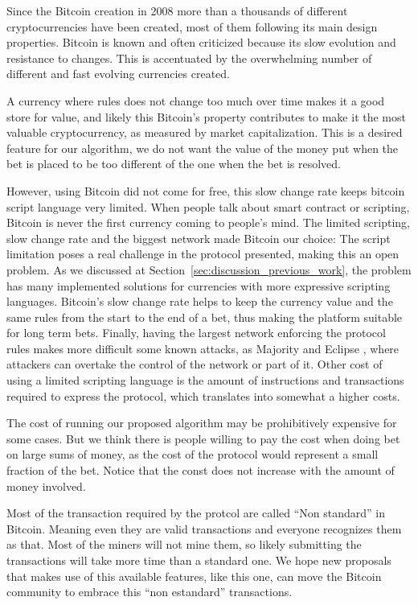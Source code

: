 Since the Bitcoin creation in 2008 more than a thousands of different
  cryptocurrencies have been created, most of them following its main design
  properties.
Bitcoin is known and often criticized because its slow evolution and resistance
  to changes.
This is accentuated by the overwhelming number of different and fast evolving
  currencies created.

A currency where rules does not change too much over time makes it a good store
  for value, and likely this Bitcoin's property contributes to make it the
  most valuable cryptocurrency, as measured by market capitalization.
This is a desired feature for our algorithm, we do not want the value of the
  money put when the bet is placed to be too different of the one when the bet
  is resolved.

However, using Bitcoin did not come for free, this slow change rate keeps
  bitcoin script language very limited.
When people talk about smart contract or scripting, Bitcoin is never the first
  currency coming to people's mind.
The limited scripting, slow change rate and the biggest network made Bitcoin our
  choice:
The script limitation poses a real challenge in the protocol presented, making this
  an open problem.
As we discussed at Section~\ref{sec:discussion_previous_work}, the problem has
  many implemented solutions for currencies with more expressive scripting
  languages.
Bitcoin's slow change rate helps to keep the currency value and the same rules
  from the start to the end of a bet, thus making the platform suitable for long
  term bets.
Finally, having the largest network enforcing the protocol rules makes more
  difficult some known attacks, as Majority and Eclipse
  \cite{heilman2015eclipse}, where attackers can overtake the control of the
  network or part of it.
Other cost of using a limited scripting language is the amount of instructions
  and transactions required to express the protocol, which translates into
  somewhat a higher costs.

The cost of running our proposed algorithm may be prohibitively expensive for
  some cases.
But we think there is people willing to pay the cost when doing bet on large
  sums of money, as the cost of the protocol would represent a small fraction of
  the bet.
Notice that the const does not increase with the amount of money involved.

Most of the transaction required by the protcol are called ``Non standard''
  in Bitcoin.
Meaning even they are valid transactions and everyone recognizes them as that.
Most of the miners will not mine them, so likely submitting the transactions
  will take more time than a standard one.
We hope new proposals that makes use of this available features, like this one,
  can move the Bitcoin community to embrace this ``non estandard'' transactions.

